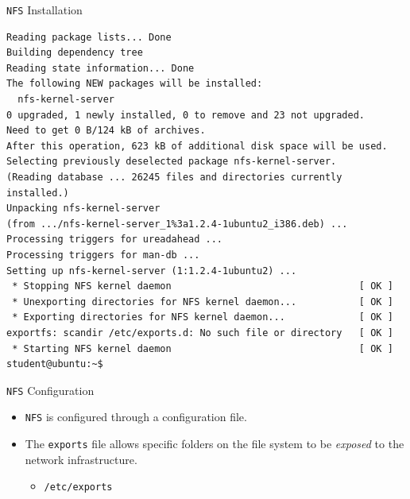 \documentclass[xcolor=table]{beamer}
\begin{document}
\begin{frame}[fragile]{\texttt{NFS} Installation}
  \begin{tcolorbox}
    \lstset{
      basicstyle=\tiny\ttfamily,
    }
    \begin{lstlisting}
Reading package lists... Done
Building dependency tree
Reading state information... Done
The following NEW packages will be installed:
  nfs-kernel-server
0 upgraded, 1 newly installed, 0 to remove and 23 not upgraded.
Need to get 0 B/124 kB of archives.
After this operation, 623 kB of additional disk space will be used.
Selecting previously deselected package nfs-kernel-server.
(Reading database ... 26245 files and directories currently installed.)
Unpacking nfs-kernel-server 
(from .../nfs-kernel-server_1%3a1.2.4-1ubuntu2_i386.deb) ...
Processing triggers for ureadahead ...
Processing triggers for man-db ...
Setting up nfs-kernel-server (1:1.2.4-1ubuntu2) ...
 * Stopping NFS kernel daemon                                 [ OK ]
 * Unexporting directories for NFS kernel daemon...           [ OK ]
 * Exporting directories for NFS kernel daemon...             [ OK ]              
exportfs: scandir /etc/exports.d: No such file or directory   [ OK ]
 * Starting NFS kernel daemon                                 [ OK ]
student@ubuntu:~$

    \end{lstlisting}
  \end{tcolorbox}
\end{frame}

\begin{frame}{\texttt{NFS} Configuration}
  \begin{itemize}
    \item \texttt{NFS} is configured through a configuration file.
    \item The \texttt{exports} file allows specific folders on the file system to be \textit{exposed} to the network infrastructure.
      \begin{itemize}
        \item \texttt{/etc/exports}
      \end{itemize}
  \end{itemize}
\end{frame}
\end{document}
